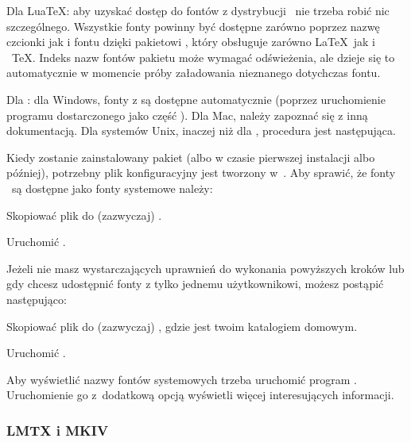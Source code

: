 \documentclass{article}
\begin{document}
Dla Lua\TeX: aby uzyskać dostęp do fontów z dystrybucji \TL\ nie trzeba robić nic szczególnego. Wszystkie fonty powinny być dostępne zarówno poprzez nazwę czcionki jak i fontu dzięki pakietowi , który obsługuje zarówno \LaTeX \ jak i ~TeX. Indeks nazw fontów  pakietu  może wymagać odświeżenia, ale dzieje się to automatycznie w momencie próby załadowania nieznanego dotychczas fontu.

 Dla \XeTeX: dla Windows, fonty z \TL\/ są dostępne automatycznie (poprzez uruchomienie programu  dostarczonego jako część \TL).
 Dla Mac, należy zapoznać się z inną dokumentacją. Dla systemów Unix, inaczej niż dla \macOS, procedura jest następująca.
 
 Kiedy zostanie zainstalowany pakiet  (albo w czasie pierwszej instalacji albo później), potrzebny plik konfiguracyjny jest tworzony w~. Aby sprawić, że fonty \TL\ są dostępne jako fonty systemowe należy:
 \begin{enumerate*}
\item Skopiować plik  do  (zazwyczaj)
.
\item Uruchomić .
\end{enumerate*}

Jeżeli nie masz wystarczających uprawnień do wykonania powyższych kroków lub gdy chcesz udostępnić fonty z \TL{} tylko jednemu użytkownikowi, możesz postąpić następująco:
\begin{enumerate*}
\item Skopiować plik  do (zazwyczaj)
      , gdzie \filename{~} jest twoim katalogiem domowym.
\item Uruchomić .
\end{enumerate*}


Aby wyświetlić nazwy fontów systemowych trzeba uruchomić program .
Uruchomienie go z~dodatkową opcją  wyświetli
więcej interesujących informacji.



\subsubsection{\protect\ConTeXt{} LMTX i MKIV}
\label{sec:context-mkiv}
\end{document}
